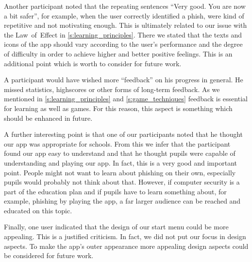 \begin{description}[leftmargin=0cm]
Another participant noted that the repeating sentences ``Very good. You are now a bit safer'', for example, when the user correctly identified a phish, were kind of repetitive and not motivating enough. This is ultimately related to our issue with the Law~of~Effect in \autoref{s:learning_principles}.
There we stated that the texts and icons of the app should vary according to the user's performance and the degree of difficulty in order to achieve higher and better positive feelings.
This is an additional point which is worth to consider for future work.

A participant would have wished more ``feedback'' on his progress in general. 
He missed statistics, highscores or other forms of long-term feedback.
As we mentioned in \autoref{s:learning_principles} and \autoref{s:game_techniques} feedback is essential for learning as well as games.
For this reason, this aspect is something which should be enhanced in future.

A further interesting point is that one of our participants noted that he thought our app was appropriate for schools.
From this we infer that the participant found our app easy to understand and that he thought pupils were capable of understanding and playing our app.
In fact, this is a very good and important point.
People might not want to learn about phishing on their own, especially pupils would probably not think about that.
However, if computer security is a part of the education plan and if pupils have to learn something about, for example, phishing by playing the app, a far larger audience can be reached and educated on this topic.	

Finally, one user indicated that the design of our start menu could be more appealing.
This is a justified criticism.
In fact, we did not put our focus in design aspects.
To make the app's outer appearance more appealing design aspects could be considered for future work.
\end{description}

